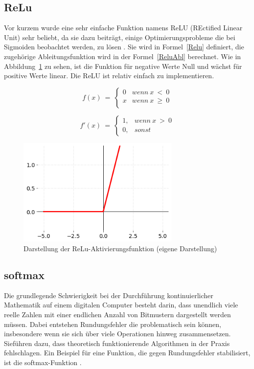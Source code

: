 \subsection{ReLu}
Vor kurzem wurde eine sehr einfache Funktion namens ReLU (REctified Linear Unit) sehr beliebt, da sie dazu beiträgt, einige Optimierungsprobleme die bei Sigmoiden beobachtet werden, zu lösen \cite*[11]{AntonioGuili;AmitaKapoor;SujitPal2019}. Sie wird in Formel~\ref{Relu} definiert, die zugehörige Ableitungsfunktion wird in der Formel~\ref{ReluAbl} berechnet. Wie in Abbildung~\ref{Kap2:ReLu_plot} zu sehen, ist die Funktion für negative Werte Null und wächst für positive Werte linear. Die ReLU ist relativ einfach zu implementieren.

\begin{equation} \label{Relu}
    f( x) \ =\ \begin{cases}
        0 & wenn\ x\  <\ 0    \\
        x & wenn\ x\  \geq\ 0 \\
    \end{cases}
\end{equation}

\begin{equation} \label{ReluAbl}
    f'( x) \ =\ \begin{cases}
        1, & wenn\ x\  >\ 0 \\
        0, & sonst
    \end{cases}
\end{equation}

\begin{figure}[H]
    \centering
    \includegraphics[width=8cm]{kapitel2/relu_plot.png}
    \caption[Darstellung der ReLu-Aktivierungsfunktion]{Darstellung der ReLu-Aktivierungsfunktion (eigene Darstellung)}
    \label{Kap2:ReLu_plot}
\end{figure}

\subsection{softmax}
Die grundlegende Schwierigkeit bei der Durchführung kontinuierlicher Mathematik auf einem digitalen Computer besteht darin, dass unendlich viele reelle Zahlen mit einer endlichen Anzahl von Bitmustern dargestellt werden müssen. Dabei entstehen Rundungsfehler die problematisch sein können, insbesondere wenn sie sich über viele Operationen hinweg zusammensetzen. Sieführen dazu, dass theoretisch funktionierende Algorithmen in der Praxis fehlschlagen. Ein Beispiel für eine Funktion, die gegen Rundungsfehler stabilisiert, ist die softmax-Funktion \cite*[80-81]{IanGoodfellowYoshuaBengio2016}.

